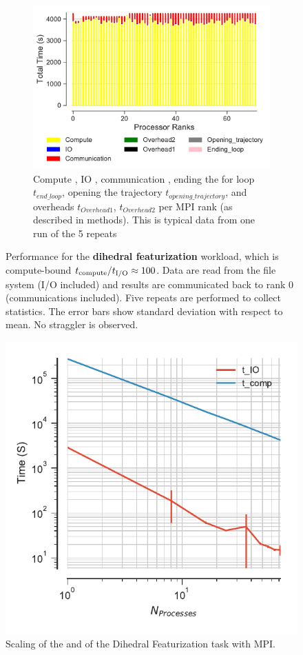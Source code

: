 \begin{figure}[ht!]
\begin{subfigure} {.8\textwidth}
  \includegraphics[width=\linewidth]{figures/main-dihedral-BarPlot-rank-comparison_72_5.pdf}
  \caption{Compute \tcomp, IO \tIO, communication \tcomm, ending the for loop $t_{end\_loop}$,
  opening the trajectory $t_{opening\_trajectory}$, and overheads $t_{Overhead1}$,  $t_{Overhead2}$ per MPI rank (as described in methods).
  This is typical data from one run of the 5 repeats}
  \label{fig:MPIranks-dihed}
\end{subfigure}
%
\caption{Performance for the \textbf{dihedral featurization} workload,
which is compute-bound ${t}_{\text{compute}}/{t}_{\text{I/O}} \approx 100$. Data are read from the file system (I/O included) 
and results are communicated back to rank 0 (communications included). Five repeats are performed to collect statistics. 
The error bars show standard deviation with respect to mean. No straggler is observed.} 
\label{fig:MPIwithIO-dihed}
\end{figure} 

\begin{figure}[ht!]
  \centering
  \includegraphics[width=0.4\linewidth]{figures/main-dihed-time_comp_IO_comparison.pdf}
\caption{Scaling of the \tcomp and \tIO of the Dihedral Featurization task with MPI.}
\label{fig:ScalingComputeIO-dihed}
\end{figure}

